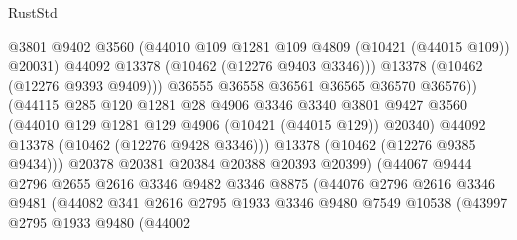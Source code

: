 \begin{lexlean}{RustStd}
\begin{coremodule}
                                    @3801
                                    @9402
                                    @3560
                                    (@44010 @109 @1281 @109 @4809 (@10421 (@44015 @109)) @20031)
                                    @44092
                                    @13378
                                    (@10462 (@12276 @9403 @3346)))
                                  @13378
                                  (@10462 (@12276 @9393 @9409)))
                                @36555
                                @36558
                                @36561
                                @36565
                                @36570
                                @36576))
                            (@44115
                              @285
                              @120
                              @1281
                              @28
                              @4906
                              @3346
                              @3340
                              @3801
                              @9427
                              @3560
                              (@44010 @129 @1281 @129 @4906 (@10421 (@44015 @129)) @20340)
                              @44092
                              @13378
                              (@10462 (@12276 @9428 @3346)))
                            @13378
                            (@10462 (@12276 @9385 @9434)))
                          @20378
                          @20381
                          @20384
                          @20388
                          @20393
                          @20399)
                        (@44067
                          @9444
                          @2796
                          @2655
                          @2616
                          @3346
                          @9482
                          @3346
                          @8875
                          (@44076
                            @2796
                            @2616
                            @3346
                            @9481
                            (@44082
                              @341
                              @2616
                              @2795
                              @1933
                              @3346
                              @9480
                              @7549
                              @10538
                              (@43997
                                @2795
                                @1933
                                @9480
                                (@44002

\end{coremodule}
\end{lexlean}
